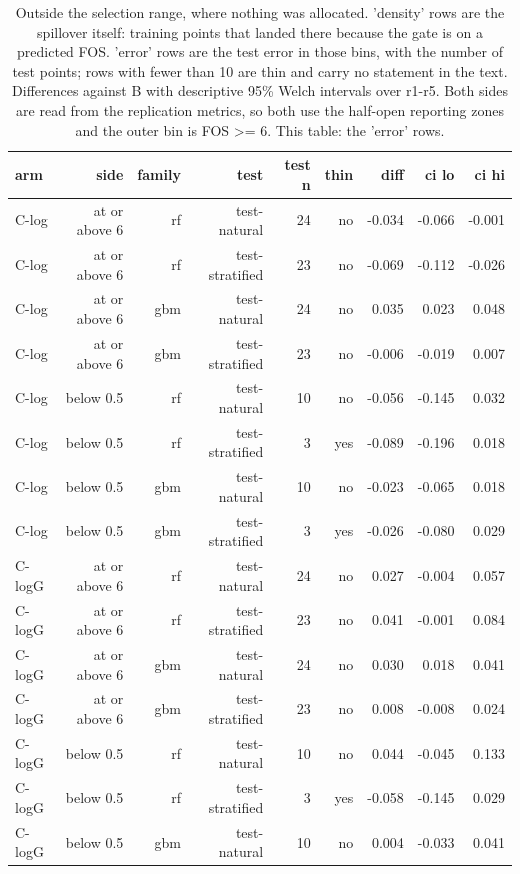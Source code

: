 \begin{table}[htbp]
\centering
\small
\setlength{\tabcolsep}{4pt}
\caption{Outside the selection range, where nothing was allocated. 'density' rows are the spillover itself: training points that landed there because the gate is on a predicted FOS. 'error' rows are the test error in those bins, with the number of test points; rows with fewer than 10 are thin and carry no statement in the text. Differences against B with descriptive 95\% Welch intervals over r1-r5. Both sides are read from the replication metrics, so both use the half-open reporting zones and the outer bin is FOS >= 6. This table: the 'error' rows.}
\label{tab:structural:outside:error}
\begin{tabular}{lrrrrrrrr}
\toprule
arm & side & family & test & test n & thin & diff & ci lo & ci hi \\
\midrule
C-log & at or above 6 & rf & test-natural & 24 & no & -0.034 & -0.066 & -0.001 \\
C-log & at or above 6 & rf & test-stratified & 23 & no & -0.069 & -0.112 & -0.026 \\
C-log & at or above 6 & gbm & test-natural & 24 & no & 0.035 & 0.023 & 0.048 \\
C-log & at or above 6 & gbm & test-stratified & 23 & no & -0.006 & -0.019 & 0.007 \\
C-log & below 0.5 & rf & test-natural & 10 & no & -0.056 & -0.145 & 0.032 \\
C-log & below 0.5 & rf & test-stratified & 3 & yes & -0.089 & -0.196 & 0.018 \\
C-log & below 0.5 & gbm & test-natural & 10 & no & -0.023 & -0.065 & 0.018 \\
C-log & below 0.5 & gbm & test-stratified & 3 & yes & -0.026 & -0.080 & 0.029 \\
C-logG & at or above 6 & rf & test-natural & 24 & no & 0.027 & -0.004 & 0.057 \\
C-logG & at or above 6 & rf & test-stratified & 23 & no & 0.041 & -0.001 & 0.084 \\
C-logG & at or above 6 & gbm & test-natural & 24 & no & 0.030 & 0.018 & 0.041 \\
C-logG & at or above 6 & gbm & test-stratified & 23 & no & 0.008 & -0.008 & 0.024 \\
C-logG & below 0.5 & rf & test-natural & 10 & no & 0.044 & -0.045 & 0.133 \\
C-logG & below 0.5 & rf & test-stratified & 3 & yes & -0.058 & -0.145 & 0.029 \\
C-logG & below 0.5 & gbm & test-natural & 10 & no & 0.004 & -0.033 & 0.041 \\

\end{tabular}
\end{table}
